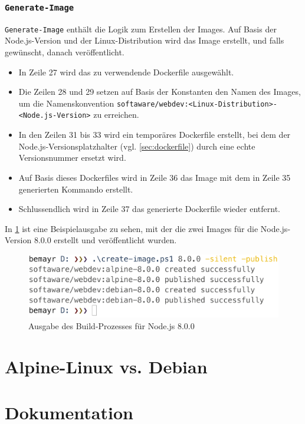\subsubsection{\texttt{Generate-Image}}
\verb|Generate-Image| enthält die Logik zum Erstellen der Images.
Auf Basis der Node.js-Version und der Linux-Distribution wird das Image erstellt, und falls gewünscht, danach veröffentlicht.
\begin{itemize}
    \item In Zeile 27 wird das zu verwendende Dockerfile ausgewählt.
    \item Die Zeilen 28 und 29 setzen auf Basis der Konstanten den Namen des Images, um die Namenskonvention \verb|softaware/webdev:<Linux-Distribution>-<Node.js-Version>| zu erreichen.
    \item In den Zeilen 31 bis 33 wird ein temporäres Dockerfile erstellt, bei dem der Node.js-Versionsplatzhalter (vgl. \cref{sec:dockerfile}) durch eine echte Versionsnummer ersetzt wird.
    \item Auf Basis dieses Dockerfiles wird in Zeile 36 das Image mit dem in Zeile 35 generierten Kommando erstellt.
    \item Schlussendlich wird in Zeile 37 das generierte Dockerfile wieder entfernt.
\end{itemize}
In \cref{fig:create-image} ist eine Beispielausgabe zu sehen, mit der die zwei Images für die Node.js-Version 8.0.0 erstellt und veröffentlicht wurden.
\begin{figure}[htbp]
    \centering
    \includegraphics[width=0.75\linewidth,clip]{images/create-image}
    \caption{Ausgabe des Build-Prozesses für Node.js 8.0.0}
\label{fig:create-image}
\end{figure}

\section{Alpine-Linux vs. Debian}
\label{sec:alpine-vs-debian}


\section{Dokumentation}
\label{sec:documentation}

